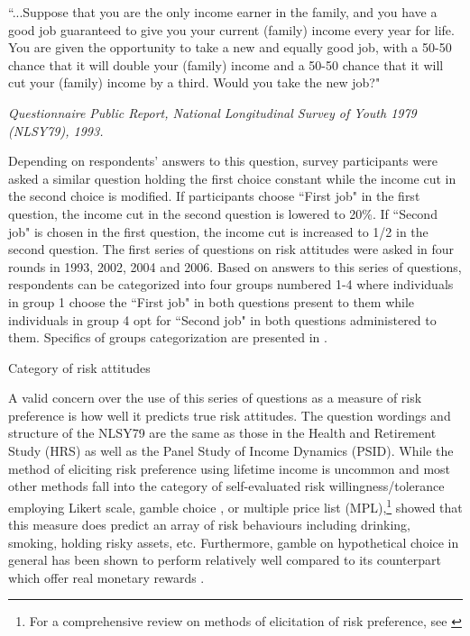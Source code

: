 \documentclass[]{article}
\begin{document}
\begin{center}
	\begin{minipage}[!h]{.9\linewidth}\small
		``...Suppose that you are the only income earner in the family, and you have a good job guaranteed to give you your current (family) income every year for life. You are given the opportunity to take a new and equally good job, with a 50-50 chance that it will double your (family) income and a 50-50 chance that it will cut your (family) income by a third. Would you take the new job?"
	\end{minipage}
\end{center}
\begin{flushright}
	\textit{Questionnaire Public Report, National Longitudinal Survey of Youth 1979 (NLSY79), 1993.}
\end{flushright}
Depending on respondents' answers to this question, survey participants were asked a similar question holding the first choice constant while the income cut in the second choice is modified. If participants choose ``First job" in the first question, the income cut in the second question is lowered to 20\%. If ``Second job" is chosen in the first question, the income cut is increased to 1/2 in the second question. The first series of questions on risk attitudes were asked in four rounds in 1993, 2002, 2004 and 2006. Based on answers to this series of questions, respondents can be categorized into four groups numbered 1-4 where individuals in group 1 choose the ``First job" in both questions present to them while individuals in group 4 opt for ``Second job" in both questions administered to them. Specifics of groups categorization are presented in .

\begin{table}[!h]
	\centering
	\setlength{\extrarowheight}{0.2em}
	\caption{Category of risk attitudes}	
	
	\label{table:1-risk-category}
\end{table}

A valid concern over the use of this series of questions as a measure of risk preference is how well it predicts true risk attitudes. The question wordings and structure of the NLSY79 are the same as those in the Health and Retirement Study (HRS) as well as the Panel Study of Income Dynamics (PSID). While the method of eliciting risk preference using lifetime income is uncommon and most other methods fall into the category of self-evaluated risk willingness/tolerance employing Likert scale, gamble choice \citep{eckel2002sex}, or multiple price list (MPL),\footnote{For a comprehensive review on methods of elicitation of risk preference, see \citet{charness2013experimental}} \citet{barsky1997preference} showed that this measure does predict an array of risk behaviours including drinking, smoking, holding risky assets, etc. Furthermore, gamble on hypothetical choice in general has been shown to perform relatively well compared to its counterpart which offer real monetary rewards \citep{binswanger1981attitudes, camerer1999effects, dohmen2005individual}. 
\end{document}
